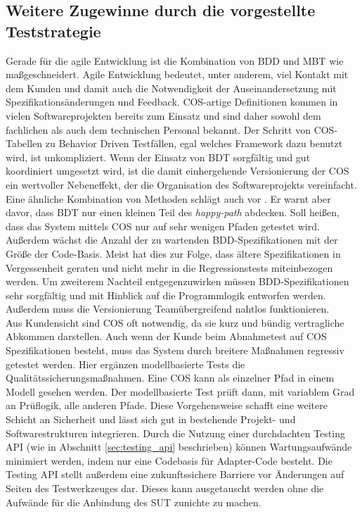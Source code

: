 \begin{itemize}
\section{Weitere Zugewinne durch die vorgestellte Teststrategie}
Gerade für die agile Entwicklung ist die Kombination von BDD und \Gls{MBT} wie maßgeschneidert. Agile Entwicklung bedeutet, unter anderem, viel Kontakt mit dem Kunden und damit auch die Notwendigkeit der Auseinandersetzung mit Spezifikationsänderungen und Feedback. \Gls{COS}-artige Definitionen kommen in vielen Softwareprojekten bereits zum Einsatz und sind daher sowohl dem fachlichen als auch dem technischen Personal bekannt. Der Schritt von \Gls{COS}-Tabellen zu Behavior Driven Testfällen, egal welches Framework dazu benutzt wird, ist unkompliziert. Wenn der Einsatz von \Gls{BDT} sorgfältig und gut koordiniert umgesetzt wird, ist die damit einhergehende Versionierung der \Gls{COS} ein wertvoller Nebeneffekt, der die Organisation des Softwareprojekts vereinfacht.\\
Eine ähnliche Kombination von Methoden schlägt auch \citeauthor{binder_model-based_2014} vor \cite{binder_model-based_2014}. Er warnt aber davor, dass \Gls{BDT} nur einen kleinen Teil des \textit{happy-path} abdecken. Soll heißen, dass das System mittels \Gls{COS} nur auf sehr wenigen Pfaden getestet wird. Außerdem wächst die Anzahl der zu wartenden \Gls{BDD}-Spezifikationen mit der Größe der Code-Basis. Meist hat dies zur Folge, dass ältere Spezifikationen in Vergessenheit geraten und nicht mehr in die Regressionstests miteinbezogen werden. Um zweiterem Nachteil entgegenzuwirken müssen \Gls{BDD}-Spezifikationen sehr sorgfältig und mit Hinblick auf die Programmlogik entworfen werden. Außerdem muss die Versionierung Teamübergreifend nahtlos funktionieren.\\
Aus Kundensicht sind \Gls{COS} oft notwendig, da sie kurz und bündig vertragliche Abkommen darstellen. Auch wenn der Kunde beim Abnahmetest auf \Gls{COS} Spezifikationen besteht, muss das System durch breitere Maßnahmen regressiv getestet werden. Hier ergänzen modellbasierte Tests die Qualitätssicherungsmaßnahmen. Eine \Gls{COS} kann als einzelner Pfad in einem Modell gesehen werden. Der modellbasierte Test prüft dann, mit variablem Grad an Prüflogik, alle anderen Pfade. Diese Vorgehensweise schafft eine weitere Schicht an Sicherheit und lässt sich gut in bestehende Projekt- und Softwarestrukturen integrieren. Durch die Nutzung einer durchdachten Testing API (wie in Abschnitt \ref{sec:testing_api} beschrieben) können Wartungsaufwände minimiert werden, indem nur eine Codebasis für Adapter-Code besteht. Die Testing API stellt außerdem eine zukunftssichere Barriere vor Änderungen auf Seiten des Testwerkzeuges dar. Dieses kann ausgetauscht werden ohne die Aufwände für die Anbindung des \Gls{SUT} zunichte zu machen.\\

\end{itemize}

